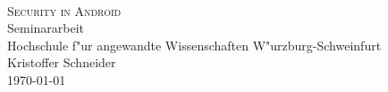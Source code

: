 \documentclass[12pt,a4paper]{scrartcl}
\begin{document}
	

\begin{titlepage}
   	\mbox{}\vspace{5\baselineskip}\\
   	\rmfamily\huge
   	\centering
	\textsc{Security in Android}
	\\[3ex]
   	Seminararbeit
   	\rmfamily\Large
   	\vspace{1\baselineskip}\\
	Hochschule f"ur angewandte Wissenschaften W"urzburg-Schweinfurt
   	\vspace{5\baselineskip}\\
   	\rmfamily\Large
   	Kristoffer Schneider
   	\vspace{1\baselineskip}\\
   	\today
\end{titlepage}

	\tableofcontents
	\newpage
	
	\listoffigures
	\newpage

	
	\newpage
	
	
	\newpage
	
	
	\newpage
	
	
\end{document}
